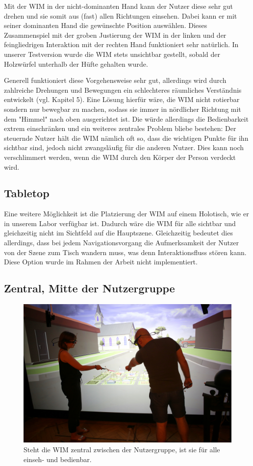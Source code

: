 Mit der WIM in der nicht-dominanten Hand kann der Nutzer diese sehr gut drehen und sie somit aus (fast) allen Richtungen einsehen. Dabei kann er mit seiner dominanten Hand die gewünschte Position auswählen. Dieses Zusammenspiel mit der groben Justierung der WIM in der linken und der feingliedrigen Interaktion mit der rechten Hand funktioniert sehr natürlich.
In unserer Testversion wurde die WIM stets unsichtbar gestellt, sobald der Holzwürfel unterhalb der Hüfte gehalten wurde.

Generell funktioniert diese Vorgehensweise sehr gut, allerdings wird durch zahlreiche Drehungen und Bewegungen ein schlechteres räumliches Verständnis entwickelt (vgl. Kapitel 5). Eine Lösung hierfür wäre, die WIM nicht rotierbar sondern nur bewegbar zu machen, sodass sie immer in nördlicher Richtung mit dem "Himmel" nach oben ausgerichtet ist. Die würde allerdings die Bedienbarkeit extrem einschränken und ein weiteres zentrales Problem bliebe bestehen:
Der steuernde Nutzer hält die WIM nämlich oft so, dass die wichtigen Punkte für ihn sichtbar sind, jedoch nicht zwangsläufig für die anderen Nutzer. Dies kann noch verschlimmert werden, wenn die WIM durch den Körper der Person verdeckt wird.


\subsection{Tabletop}
Eine weitere Möglichkeit ist die Platzierung der WIM auf einem Holotisch, wie er in unserem Labor verfügbar ist.
Dadurch wäre die WIM für alle sichtbar und gleichzeitig nicht im Sichtfeld auf die Hauptszene. Gleichzeitig bedeutet dies allerdings, dass bei jedem Navigationsvorgang die Aufmerksamkeit der Nutzer von der Szene zum Tisch wandern muss, was denn Interaktionsfluss stören kann. Diese Option wurde im Rahmen der Arbeit nicht implementiert.

\subsection{Zentral, Mitte der Nutzergruppe}


\begin{figure}[h!]
  \centering
  \includegraphics[width=\textwidth]{images/wim_zentral.JPG}
  \caption{Steht die WIM zentral zwischen der Nutzergruppe, ist sie für alle einseh- und bedienbar.}
  \label{fig:todo}
\end{figure}

